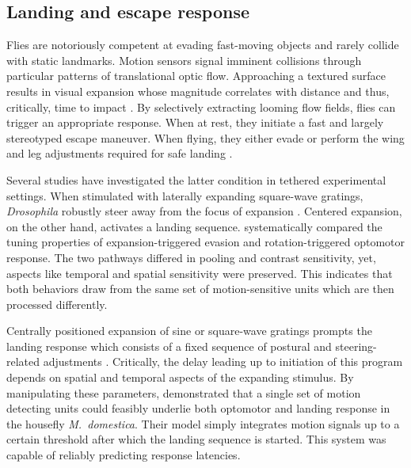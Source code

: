 \subsection{Landing and escape response}
Flies are notoriously competent at evading fast-moving objects and rarely collide with static landmarks. Motion sensors signal imminent collisions through particular patterns of translational optic flow. Approaching a textured surface results in visual expansion whose magnitude correlates with distance and thus, critically, time to impact \citep{Koenderink:1986um}. By selectively extracting looming flow fields, flies can trigger an appropriate response. When at rest, they initiate a fast and largely stereotyped escape maneuver. When flying, they either evade or perform the wing and leg adjustments required for safe landing \citep{Borst:2014kl}.

Several studies have investigated the latter condition in tethered experimental settings. When stimulated with laterally expanding square-wave gratings, \textit{Drosophila} robustly steer away from the focus of expansion \citep{Tammero:2002aa}. Centered expansion, on the other hand, activates a landing sequence. \citet{Duistermars:2007aa} systematically compared the tuning properties of expansion-triggered evasion and rotation-triggered optomotor response. The two pathways differed in pooling and contrast sensitivity, yet, aspects like temporal and spatial sensitivity were preserved. This indicates that both behaviors draw from the same set of motion-sensitive units which are then processed differently.

Centrally positioned expansion of sine or square-wave gratings prompts the landing response which consists of a fixed sequence of postural and steering-related adjustments \citep{Goodman:1960aa,Braitenberg:1966aa,Borst:1986wx}. Critically, the delay leading up to initiation of this program depends on spatial and temporal aspects of the expanding stimulus. By manipulating these parameters, \citet{Bahde:1986eh} demonstrated that a single set of motion detecting units could feasibly underlie both optomotor and landing response in the housefly \textit{M.\ domestica}. Their model simply integrates motion signals up to a certain threshold after which the landing sequence is started. This system was capable of reliably predicting response latencies.

